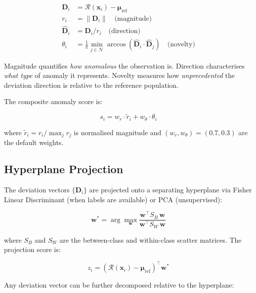 \documentclass[journal]{IEEEtran}
\newcommand{\N}{\mathcal{N}}
\newcommand{\calR}{\mathcal{R}}
\newcommand{\norm}[1]{\left\lVert#1\right\rVert}
\begin{document}
\begin{align}
\mathbf{D}_i &= \calR(\mathbf{x}_i) - \boldsymbol{\mu}_{\text{ref}} \label{eq:dev_vec} \\
r_i &= \norm{\mathbf{D}_i} \quad\text{(magnitude)} \label{eq:magnitude} \\
\hat{\mathbf{D}}_i &= \mathbf{D}_i / r_i \quad\text{(direction)} \label{eq:direction} \\
\theta_i &= \frac{1}{\pi}\min_{j \in \N} \arccos\!\left(\hat{\mathbf{D}}_i \cdot \hat{\mathbf{D}}_j\right) \quad\text{(novelty)} \label{eq:novelty}
\end{align}

Magnitude quantifies \textit{how anomalous} the observation is. Direction characterises \textit{what type} of anomaly it represents. Novelty measures how \textit{unprecedented} the deviation direction is relative to the reference population.

The composite anomaly score is:

\begin{equation}
s_i = w_r \cdot \tilde{r}_i + w_\theta \cdot \theta_i
\label{eq:score}
\end{equation}

where $\tilde{r}_i = r_i / \max_j r_j$ is normalised magnitude and $(w_r, w_\theta) = (0.7, 0.3)$ are the default weights.

\subsection{Hyperplane Projection}
\label{ssec:projection}

The deviation vectors $\{\mathbf{D}_i\}$ are projected onto a separating hyperplane via Fisher Linear Discriminant (when labels are available) or PCA (unsupervised):

\begin{equation}
\mathbf{w}^* = \arg\max_{\mathbf{w}} \frac{\mathbf{w}^\top S_B\, \mathbf{w}}{\mathbf{w}^\top S_W\, \mathbf{w}}
\label{eq:fisher}
\end{equation}

where $S_B$ and $S_W$ are the between-class and within-class scatter matrices. The projection score is:

\begin{equation}
z_i = (\calR(\mathbf{x}_i) - \boldsymbol{\mu}_{\text{ref}})^\top \mathbf{w}^*
\label{eq:proj_score}
\end{equation}

Any deviation vector can be further decomposed relative to the hyperplane:
\end{document}
